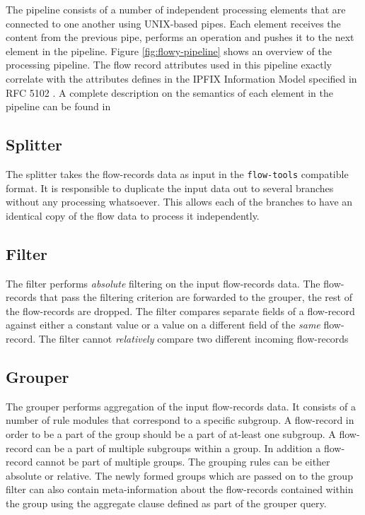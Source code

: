 The pipeline consists of a number of independent processing elements that are connected to one another using UNIX-based pipes. Each element receives the content from the previous pipe, performs an operation and pushes it to the next element in the pipeline. Figure \ref{fig:flowy-pipeline} shows an overview of the processing pipeline. The flow record attributes used in this pipeline exactly correlate with the attributes defines in the \ac{IPFIX} Information Model specified in RFC 5102 \cite{rfc5102}. A complete description on the semantics of each element in the pipeline can be found in \cite{vmarinov:thesis:2009}

\subsection{Splitter}\label{subsec:splitter}
The splitter takes the flow-records data as input in the \texttt{flow-tools} compatible format. It is responsible to duplicate the input data out to several branches without any processing whatsoever. This allows each of the branches to have an identical copy of the flow data to process it independently.

\subsection{Filter}\label{subsec:filter}
The filter performs \emph{absolute} filtering on the input flow-records data. The flow-records that pass the filtering criterion are forwarded to the grouper, the rest of the flow-records are dropped. The filter compares separate fields of a flow-record against either a constant value or a value on a different field of the \emph{same} flow-record. The filter cannot \emph{relatively} compare two different incoming flow-records

\subsection{Grouper}\label{subsec:grouper}
The grouper performs aggregation of the input flow-records data. It consists of a number of rule modules that correspond to a specific subgroup. A flow-record in order to be a part of the group should be a part of at-least one subgroup. A flow-record can be a part of multiple subgroups within a group. In addition a flow-record cannot be part of multiple groups. The grouping rules can be either absolute or relative. The newly formed groups which are passed on to the group filter can also contain meta-information about the flow-records contained within the group using the aggregate clause defined as part of the grouper query.

